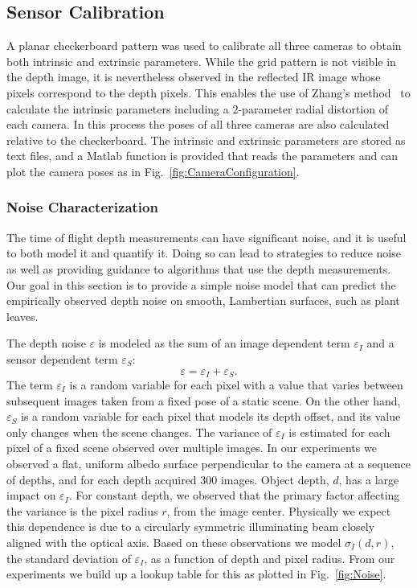 

\subsection{Sensor Calibration}

A planar checkerboard pattern was used to calibrate all three cameras to obtain both intrinsic and extrinsic parameters. 
While the grid pattern is not visible in the depth image, it is nevertheless observed in the reflected IR image whose pixels correspond to the depth pixels. 
This enables the use of Zhang's method~\cite{Zhang2000} to calculate the intrinsic parameters including a $2$-parameter radial distortion of each camera. 
In this process the poses of all three cameras are also calculated relative to the checkerboard. 
The intrinsic and extrinsic parameters are stored as text files, and a Matlab function is provided that reads the parameters and can plot the camera poses as in Fig.~\ref{fig:CameraConfiguration}.


\subsubsection{Noise Characterization}
\label{sec:bias}

The time of flight depth measurements can have significant noise, and it is useful to both model it and quantify it. 
Doing so can lead to strategies to reduce noise as well as providing guidance to algorithms that use the depth measurements. 
Our goal in this section is to provide a simple noise model that can predict the empirically observed depth noise on smooth, Lambertian surfaces, such as plant leaves.

The depth noise $\varepsilon$ is modeled as the sum of an image dependent term $\varepsilon_I$ and a sensor dependent term $\varepsilon_S$:
\begin{equation}
\varepsilon = \varepsilon_I + \varepsilon_S. \label{eq:epsilon}
\end{equation}
The term $\varepsilon_I$ is a random variable for each pixel with a value that varies between subsequent images taken from a fixed pose of a static scene.  
On the other hand, $\varepsilon_S$ is a random variable for each pixel that models its depth offset, and its value only changes when the scene changes.  
The variance of $\varepsilon_I$ is estimated for each pixel of a fixed scene observed over multiple images. 
In our experiments we observed a flat, uniform albedo surface perpendicular to the camera at a sequence of depths, and for each depth acquired $300$ images. 
Object depth, $d$, has a large impact on $\varepsilon_I$. 
For constant depth, we observed that the primary factor affecting the variance is the pixel radius $r$, from the image center. 
Physically we expect this dependence is due to a circularly symmetric illuminating beam closely aligned with the optical axis. 
Based on these observations we model $\sigma_I(d,r)$, the standard deviation of $\varepsilon_I$, as a function of depth and pixel radius.  
From our experiments we build up a lookup table for this as plotted in Fig.~\ref{fig:Noise}.

